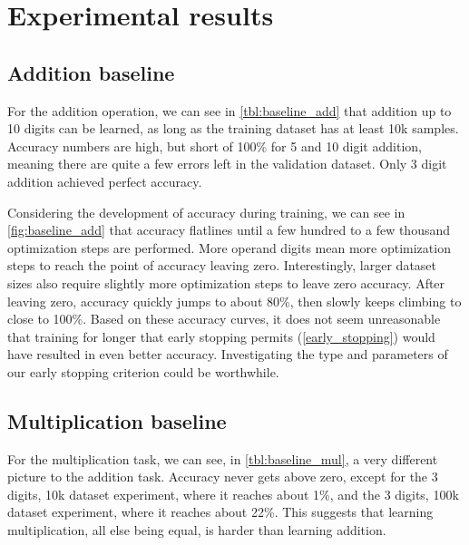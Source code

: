 \section{Experimental results}


\subsection{Addition baseline}

For the addition operation, we can see in \cref{tbl:baseline_add} that addition up to 10 digits can be learned, as long as the training dataset has at least 10k samples. Accuracy numbers are high, but short of 100\% for 5 and 10 digit addition, meaning there are quite a few errors left in the validation dataset. Only 3 digit addition achieved perfect accuracy.

Considering the development of accuracy during training, we can see in \cref{fig:baseline_add} that accuracy flatlines until a few hundred to a few thousand optimization steps are performed. More operand digits mean more optimization steps to reach the point of accuracy leaving zero. Interestingly, larger dataset sizes also require slightly more optimization steps to leave zero accuracy.
After leaving zero, accuracy quickly jumps to about 80\%, then slowly keeps climbing to close to 100\%.
Based on these accuracy curves, it does not seem unreasonable that training for longer that early stopping permits (\cref{early_stopping}) would have resulted in even better accuracy. Investigating the type and parameters of our early stopping criterion could be worthwhile.



\subsection{Multiplication baseline}

For the multiplication task, we can see, in \cref{tbl:baseline_mul}, a very different picture to the addition task. Accuracy never gets above zero, except for the 3 digits, 10k dataset experiment, where it reaches about 1\%, and the 3 digits, 100k dataset experiment, where it reaches about 22\%.
This suggests that learning multiplication, all else being equal, is harder than learning addition.

